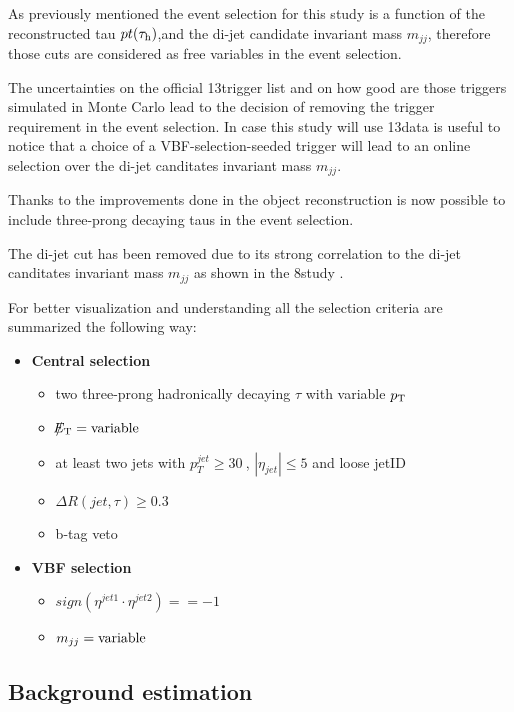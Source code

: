 As previously mentioned the event selection for this study is a function of the reconstructed tau $pt(\tau_{\text{h}})$,\met and the di-jet candidate invariant mass $m_{jj}$, therefore those cuts are considered as free variables in the event selection. 

The uncertainties on the official 13\tev trigger list and on how good are those triggers simulated in Monte Carlo lead to the decision of removing the trigger requirement in the event selection. In case this study will use 13\tev data is useful to notice that a choice of a VBF-selection-seeded trigger will lead to an online selection over the di-jet canditates invariant mass $m_{jj}$.

Thanks to the improvements done in the \hadtau object reconstruction is now possible to include three-prong decaying taus in the event selection.

The di-jet \deltaeta cut has been removed due to its strong correlation to the di-jet canditates invariant mass $m_{jj}$ as shown in the 8\tev study \cite{Khachatryan:2015kxa}.

For better visualization and understanding all the selection criteria are summarized the following way:

\begin{itemize}
	\item \textbf{Central selection}
	\begin{itemize}
		\item two three-prong hadronically decaying $\tau$ with variable $p_{\text{T}}$
		\item $\slash\mkern-12mu{E}_{\text{T}} = \text{variable}$
		\item at least two jets with $p_{T}^{jet}\geq30~$\gev, $|\eta_{jet}|\leq5$ and loose jetID
		\item $\Delta R(jet,\tau)\geq0.3$
		\item b-tag veto
	\end{itemize}
	\item \textbf{VBF selection}
	\begin{itemize}
		\item $sign(\eta^{jet 1}\cdot\eta^{jet 2})==-1$
		\item $m_{jj} = \text{variable}$
	\end{itemize}
\end{itemize}

\subsection{Background estimation}

